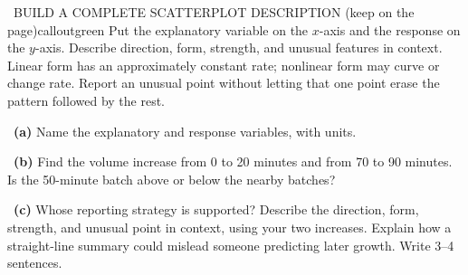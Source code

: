 \documentclass[11pt]{article}
\begin{document}
\begin{callout}{\IconBook\ BUILD A COMPLETE SCATTERPLOT DESCRIPTION (keep on the page)}{calloutgreen}
Put the explanatory variable on the $x$-axis and the response on the $y$-axis.
Describe direction, form, strength, and unusual features in context. Linear form has
an approximately constant rate; nonlinear form may curve or change rate. Report an
unusual point without letting that one point erase the pattern followed by the rest.
\end{callout}

~\textbf{(a)} Name the explanatory and response variables, with units.\par
{}

~\textbf{(b)} Find the volume increase from 0 to 20 minutes and from 70 to 90 minutes. Is the 50-minute batch above or below the nearby batches?\par
{}

~\textbf{(c)} Whose reporting strategy is supported? Describe the direction, form, strength, and unusual point in context, using your two increases. Explain how a straight-line summary could mislead someone predicting later growth. Write 3--4 sentences.\par
{}
\end{document}
